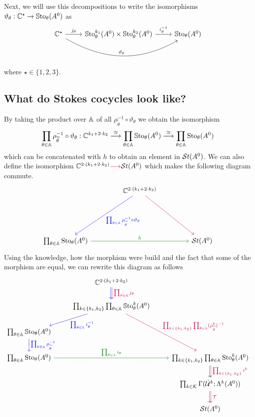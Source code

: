 Next, we will use this decompositions to write the isomorphisms
$\vartheta_\theta:\mathbb{C}^\star\to \operatorname{\mathbb{S}to}_\theta(A^0)$ as
\[ \begin{tikzcd}
  \C^\star
  \rar{j_\theta}
  \arrow[rr,out=-30,in=-150,"\vartheta_\theta"]
  &
  \SSto_\theta^{k_1}(A^0)\times\SSto_\theta^{k_2}(A^0)
  \rar{i_\theta^{-1}}
  &
  \SSto_\theta(A^0)
\end{tikzcd} \]
where $\star\in\{1,2,3\}$.

\subsection{What do Stokes cocycles look like?}
\begin{prop}
  By taking the product over $\mathbb{A}$ of all
  $\rho_{\tilde\theta}^{-1}\circ\vartheta_\theta$ we obtain the isomorphism
  \[
    \prod_{\theta\in\mathbb{A}}\rho_{\widetilde\theta}^{-1}\circ\vartheta_\theta:
    \mathbb{C}^{k_1+2\cdot k_2}
    \overset\cong\longrightarrow \prod_{\theta\in\mathbb{A}}\operatorname{\mathbb{S}to}_\theta(A^0)
    \overset\cong\longrightarrow \prod_{\theta\in\mathbb{A}}\operatorname{Sto}_\theta(A^0)
  \]
  which can be concatenated with $h$ to obtain an element in $\mathcal{S}{}t(A^0)$.
  We can also define the isomorphism
  $\mathbb{C}^{2\cdot(k_1+2\cdot k_2)}\textcolor{purple}{\longrightarrow} \mathcal{S}{}t(A^0)$
  which makes the following diagram commute.
  \[ \begin{tikzcd}[column sep=1.5cm,row sep=2cm]
      &\C^{2\cdot(k_1+2\cdot k_2)}
      \dlar[blue]{\prod_{\theta\in\A}\rho_{\tilde\theta}^{-1}\circ\vartheta_\theta}
      \arrow[dr,purple]
    \\\prod_{\theta\in\A}\Sto_\theta(A^0)
      \arrow[rr,green!50!black,"h"]
      &&\St(A^0)
  \end{tikzcd} \]
  Using the knowledge, how the morphism were build and the fact that some of
  the morphism are equal, we can rewrite this diagram as follows
  \[ \begin{tikzcd}
      &\C^{2\cdot(k_1+2\cdot k_2)}
      \dar[xshift=-1pt,blue]
      \dar[xshift=1pt,purple,"\prod_{\theta\in\A}j_\theta"]
    \\
      &\prod_{k\in\{k_1,k_2\}}\prod_{\theta\in\A}\SSto_{\theta}^{k}(A^0)
       \arrow[dl,blue,"\prod_{\theta\in\A}i_\theta^{-1}"]
       \arrow[ddr,purple,
         "\prod_{k\in\{k_1,k_2\}}\prod_{\theta\in\A}(\rho_{\tilde\theta}^k)^{-1}"]
    \\ \prod_{\theta\in\A} \SSto_{\theta}(A^0)
        \dar[blue]{\prod_{\theta\in\A}\rho_{\tilde\theta}^{-1}}
    \\\prod_{\theta\in\A} \Sto_{\theta}(A^0)
      \arrow[rr,green!50!black,"\prod_{\theta\in\A}i_\theta"]
      &&\prod_{k\in\{k_1,k_2\}}\prod_{\theta\in\A}\Sto_{\theta}^{k}(A^0)
      \dar[xshift=-1pt,green!50!black]
      \dar[xshift=1pt,purple]{\prod_{k\in\{k_1,k_2\}}i^k}
    \\
      && \prod_{k\in\cK}\Gamma(\dot\cU^k;\Lambda^k(A^0))
      \dar[xshift=-1pt,green!50!black]
      \dar[xshift=1pt,purple]{\cT}
    \\&& \St(A^0)
  \end{tikzcd} \]
\end{prop}


